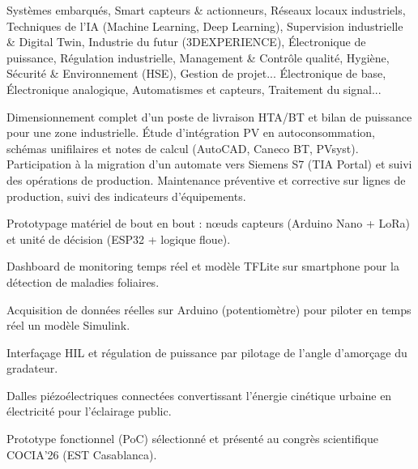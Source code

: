 \documentclass[10pt,a4paper]{../altacv}
\begin{document}
\cvidentite
{}
\makecvheader

\cvformation
{Systèmes embarqués, Smart capteurs \& actionneurs, Réseaux locaux industriels, Techniques de l’IA (Machine Learning, Deep Learning), Supervision industrielle \& Digital Twin, Industrie du futur (3DEXPERIENCE), Électronique de puissance, Régulation industrielle, Management \& Contrôle qualité, Hygiène, Sécurité \& Environnement (HSE), Gestion de projet...}
{Électronique de base, Électronique analogique, Automatismes et capteurs, Traitement du signal...}

\expcore
{Dimensionnement complet d’un poste de livraison HTA/BT et bilan de puissance pour une zone industrielle.}
{Étude d’intégration PV en autoconsommation, schémas unifilaires et notes de calcul (AutoCAD, Caneco BT, PVsyst).}
\vspace{2pt}
\expmenara
{Participation à la migration d’un automate vers Siemens S7 (TIA Portal) et suivi des opérations de production.}
{Maintenance préventive et corrective sur lignes de production, suivi des indicateurs d’équipements.}

\begin{cvitems}
  \item Prototypage matériel de bout en bout : nœuds capteurs (Arduino Nano + LoRa) et unité de décision (ESP32 + logique floue).
  \item Dashboard de monitoring temps réel et modèle TFLite sur smartphone pour la détection de maladies foliaires.
\end{cvitems}
\vspace{2pt}
\begin{cvitems}
  \item Acquisition de données réelles sur Arduino (potentiomètre) pour piloter en temps réel un modèle Simulink.
  \item Interfaçage HIL et régulation de puissance par pilotage de l’angle d’amorçage du gradateur.
\end{cvitems}
\vspace{2pt}
\begin{cvitems}
  \item Dalles piézoélectriques connectées convertissant l’énergie cinétique urbaine en électricité pour l’éclairage public.
  \item Prototype fonctionnel (PoC) sélectionné et présenté au congrès scientifique COCIA’26 (EST Casablanca).
\end{cvitems}
\end{document}
